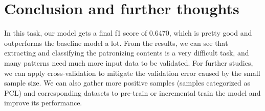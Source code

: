 \documentclass[11pt,a4paper]{article}
\begin{document}
\section{Conclusion and further thoughts}
In this task, our model gets a final f1 score of 0.6470, which is pretty good and outperforms the baseline model a lot. From the results, we can see that extracting and classifying the patronizing contents is a very difficult task, and many patterns need much more input data to be validated. For further studies, we can apply cross-validation to mitigate the validation error caused by the small sample size. We can also gather more positive samples (samples categorized as PCL) and corresponding datasets to pre-train or incremental train the model and improve its performance. 

\newpage

\end{document}
